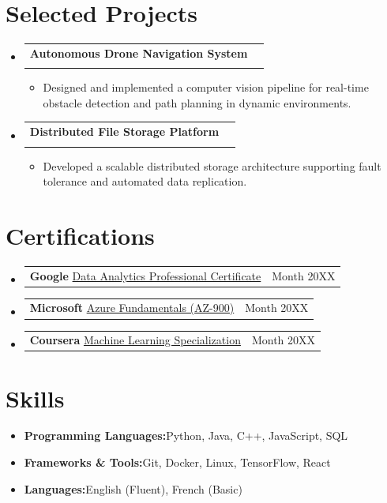 \documentclass[a4paper,11pt]{article}
\makeatletter
\newcommand{\resumeItem}[2]{
  \item{\textbf{#1}{\hspace{0.5mm}#2}}
}
\newcommand{\resumePOR}[3]{
\vspace{1mm}\item
    \begin{tabular*}{0.97\textwidth}[t]{l@{\extracolsep{\fill}}r}
        \textbf{#1}\hspace{0.3mm}#2 & {\small{#3}} 
    \end{tabular*}
    \vspace{-1mm}
}
\newcommand{\resumeProject}[4]{%
  \vspace{1.2mm}\item
  \begin{tabular*}{0.98\textwidth}[t]{l@{\extracolsep{\fill}}r}
    \textbf{#1} & \ifthenelse{\equal{#3}{}}{}{ {\footnotesize{#3}} } \\
    \ifthenelse{\equal{#2}{}}{}{\footnotesize{#2}} & \ifthenelse{\equal{#4}{}}{}{ \footnotesize{#4}} \\
  \end{tabular*}
  \vspace{-1mm}
}
\newcommand{\resumeSubItem}[2]{\resumeItem{#1}{#2}}
\newcommand{\resumeSubHeadingListStart}{\begin{itemize}[leftmargin=*,labelsep=1mm]}
\newcommand{\resumeHeadingSkillStart}{\begin{itemize}[leftmargin=*,itemsep=0.7mm, rightmargin=2ex]}
\newcommand{\resumeItemListStart}{\begin{itemize}[leftmargin=*,labelsep=1mm,itemsep=0.5mm]}
\newcommand{\resumeSubHeadingListEnd}{\end{itemize}\vspace{2mm}}
\newcommand{\resumeHeadingSkillEnd}{\end{itemize}\vspace{-1mm}}
\newcommand{\resumeItemListEnd}{\end{itemize}\vspace{-1mm}}
\makeatother
\begin{document}
\section{\textbf{Selected Projects}}
\vspace{-0.4mm}
\resumeSubHeadingListStart

\resumeProject
  {Autonomous Drone Navigation System}
  {Tools: Python, ROS, OpenCV}
  {{}[\href{}{Project Repository \faGithub}]}
  {}
\resumeItemListStart
\setlength\itemindent{1em}
  \item Designed and implemented a computer vision pipeline for real-time obstacle detection and path planning in dynamic environments.
\resumeItemListEnd

\resumeProject
  {Distributed File Storage Platform}
  {Tools: Go, Docker, Kubernetes}
  {\null}
  {\null}
\resumeItemListStart
\setlength\itemindent{1em}
  \item Developed a scalable distributed storage architecture supporting fault tolerance and automated data replication.
\resumeItemListEnd

\resumeSubHeadingListEnd
\vspace{-6mm}

\section{\textbf{Certifications}}
\vspace{-0.2mm}
\resumeSubHeadingListStart

\resumePOR{}{\textbf{Google}
{{\href{}{Data Analytics Professional Certificate}}}}{Month 20XX}

\resumePOR{}{\textbf{Microsoft}
{{\href{}{Azure Fundamentals (AZ-900)}}}}{Month 20XX}

\resumePOR{}{\textbf{Coursera}
{{\href{}{Machine Learning Specialization}}}}{Month 20XX}

\resumeSubHeadingListEnd
\vspace{-6mm}

\section{\textbf{Skills}}
\resumeHeadingSkillStart

\resumeSubItem{Programming Languages:}
{Python, Java, C++, JavaScript, SQL}

\resumeSubItem{Frameworks \& Tools:}
{Git, Docker, Linux, TensorFlow, React}

\resumeSubItem{Languages:}
{English (Fluent), French (Basic)}

\resumeHeadingSkillEnd
\end{document}
